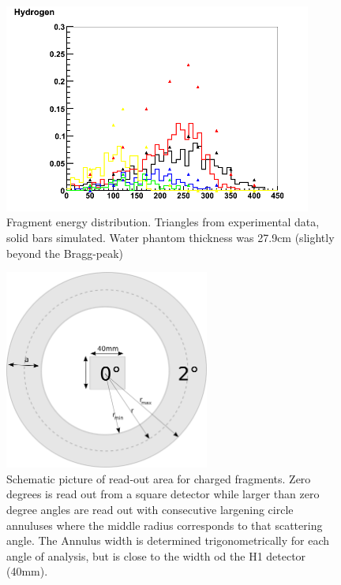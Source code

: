 \begin{figure}[h] 
\begin{center}
\includegraphics[width=0.9\textwidth]{images/fragmentEnergyDistr.png}  
\caption{\label{fig:fragmentEnergyDistr} Fragment energy distribution. Triangles from experimental data, solid bars simulated. Water phantom thickness was 27.9cm (slightly beyond the Bragg-peak)}
\end{center}
\end{figure}
\begin{figure}[!h] 
\begin{center}
\includegraphics[width=0.6\textwidth]{images/annulus.png}  
\caption{\label{fig:annulusesExplained} Schematic picture of read-out area for charged fragments. Zero degrees is read out from a square detector while larger than zero degree angles are read out with consecutive largening circle annuluses where the middle radius corresponds to that scattering angle. The Annulus width is determined trigonometrically for each angle of analysis, but is close to the width od the H1 detector (40mm).}
\end{center}
\end{figure}
